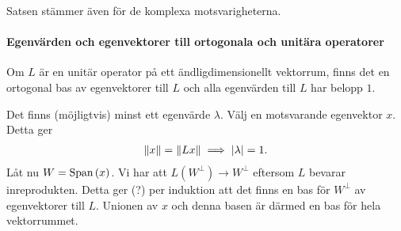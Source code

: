 Satsen stämmer även för de komplexa motsvarigheterna.

\proof

\paragraph{Egenvärden och egenvektorer till ortogonala och unitära operatorer}
Om $L$ är en unitär operator på ett ändligdimensionellt vektorrum, finns det en ortogonal bas av egenvektorer till $L$ och alla egenvärden till $L$ har belopp $1$.

\proof
Det finns (möjligtvis) minst ett egenvärde $\lambda$. Välj en motsvarande egenvektor $x$. Detta ger
\begin{align*}
	\norm{x} = \norm{Lx} \implies \abs{\lambda} = 1.
\end{align*}
Låt nu $W = \text{Span}\left(x\right)$. Vi har att $L(W^{\perp})\to W^{\perp}$ eftersom $L$ bevarar inreprodukten. Detta ger (?) per induktion att det finns en bas för $W^{\perp}$ av egenvektorer till $L$. Unionen av $x$ och denna basen är därmed en bas för hela vektorrummet.